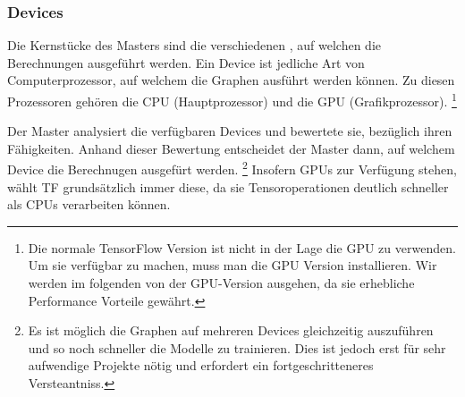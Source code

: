 \subsubsection{Devices}
Die Kernstücke des Masters sind die verschiedenen , auf
welchen die Berechnungen ausgeführt werden. Ein Device ist jedliche Art von
Computerprozessor, auf welchem die Graphen ausführt werden können.
Zu diesen Prozessoren gehören die CPU (Hauptprozessor) und die GPU (Grafikprozessor).
\footnote{
  Die normale TensorFlow Version ist nicht in der Lage die GPU zu verwenden. Um
  sie verfügbar zu machen, muss man die GPU Version installieren. Wir werden im folgenden
  von der GPU-Version ausgehen, da sie erhebliche Performance Vorteile gewährt.
}
\para{}

Der Master analysiert die verfügbaren Devices und bewertete sie, bezüglich
ihren Fähigkeiten. Anhand dieser Bewertung entscheidet der Master dann, auf
welchem Device die Berechnugen ausgefürt werden.
\footnote{
  Es ist möglich die Graphen auf mehreren Devices gleichzeitig auszuführen und
  so noch schneller die Modelle zu trainieren. Dies ist jedoch erst für sehr
  aufwendige Projekte nötig und erfordert ein fortgeschritteneres Versteantniss.
}
Insofern GPUs zur Verfügung stehen, wählt TF grundsätzlich immer diese, da
sie Tensoroperationen deutlich schneller als CPUs verarbeiten können.

